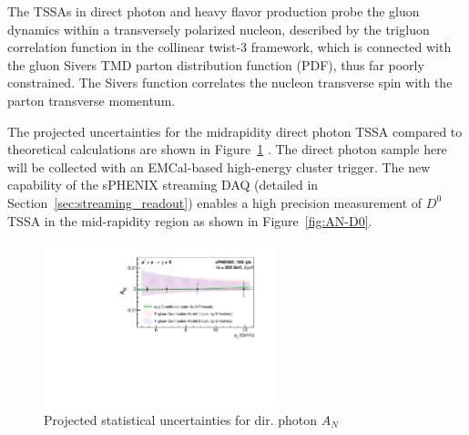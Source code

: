 The TSSAs in direct photon and heavy flavor production probe the gluon dynamics within a transversely polarized nucleon, described by the trigluon correlation function in the collinear twist-3 framework, which is connected with the gluon Sivers TMD parton distribution function (PDF), thus far poorly constrained. The Sivers function correlates the nucleon transverse spin with the parton transverse momentum.

The projected uncertainties for the midrapidity direct photon TSSA compared to theoretical calculations are shown in Figure~\ref{fig:AN_dp} . The direct photon sample here will be collected with an EMCal-based high-energy cluster trigger. 
The new capability of the sPHENIX streaming DAQ (detailed in Section~\ref{sec:streaming_readout}) enables a high precision measurement of $D^0$ TSSA in the mid-rapidity region as shown in Figure~\ref{fig:AN-D0}. 

\begin{figure}[htbp]
\centering
\includegraphics[width=0.60\textwidth]{figs/AN_dp_sphenix.pdf}
\caption{Projected statistical uncertainties for dir. photon $A_N$}
\label{fig:AN_dp}
\end{figure}

